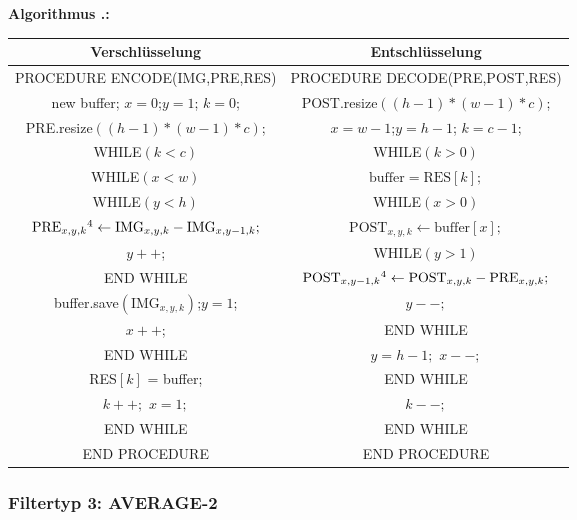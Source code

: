 \documentclass[a4paper,12pt]{article}
\newcounter{Algorithmus}
\newenvironment{Algorithmus}{
\medskip
        
        \setlength{\parindent}{0pt}
        \addtocounter{Algorithmus}{1}
        \textbf{\textsf{Algorithmus \thesubsection.\theAlgorithmus}:}}{
        \nopagebreak
        \vspace{-1.0ex}
        \bigskip
        
}
\begin{document}
\begin{Algorithmus}
\\
\begin{tabular}{c|c}
Verschlüsselung & Entschlüsselung
\\
\hline
PROCEDURE ENCODE(IMG,PRE,RES) & PROCEDURE DECODE(PRE,POST,RES)
\\
new buffer; $x=0$;$y=1$; $k=0$; & POST.resize$((h-1)*(w-1)*c)$;
\\
PRE.resize$((h-1)*(w-1)*c)$; & $x=w-1$;$y=h-1$; $k=c-1$;
\\
WHILE$(k < c)$ &  WHILE$(k > 0)$
\\
WHILE$(x < w)$ &  $\text{buffer} = \text{RES}[k];$
\\
WHILE$(y < h)$ &   WHILE$(x>0)$
\\
$\text{PRE}_{x,y,k}\footnotemark[4]\leftarrow \text{IMG}_{x,y,k} - \text{IMG}_{x,y-1,k};$ &  $\text{POST}_{x,y,k}\leftarrow \text{buffer}[x];$
\\
$y++$; & WHILE$(y>1)$
\\
END WHILE &  $\text{POST}_{x,y-1,k}\footnotemark[4]\leftarrow \text{POST}_{x,y,k} - \text{PRE}_{x,y,k};$
\\
buffer.save$(\text{IMG}_{x,y,k})$;\;$y=1$; & $y--;$
\\
$x++$; & END WHILE 
\\
END WHILE &  $y=h-1;$ $x--;$
\\
RES$[k]$ = buffer;& END WHILE 
\\
 $k++;$ $x=1;$ &  $k--;$ 
\\
END WHILE  & END WHILE
\\ 
END PROCEDURE & END PROCEDURE
\end{tabular}
\end{Algorithmus}

\subsubsection{Filtertyp 3: AVERAGE-2}
\end{document}
